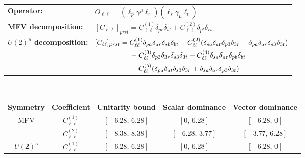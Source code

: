 \begin{table}[htbp]
\centering
{\small
\begin{tabular}{ll}
    \textbf{Operator:} & $\boxed{O_{\ell\ell} = (\overline\ell_p \gamma^\mu \ell_r)(\overline\ell_s \gamma_\mu \ell_t)}$ \\[0.2cm]
    \textbf{MFV decomposition:} &
        $[C_{\ell\ell}]_{prst} = C_{\ell\ell}^{(1)}\delta_{pr}\delta_{st} + C_{\ell\ell}^{(2)}\delta_{pt}\delta_{rs}$ \\[0.15cm]
    \textbf{$U(2)^5$ decomposition:} &
        $[C_{\ell\ell}]_{prst} =
            C_{\ell\ell}^{(1)}\Pij{p}{r}{a}\Pij{s}{t}{b}
            + C_{\ell\ell}^{(2)}(\Pij{s}{t}{a}\delta_{p3}\delta_{3r} + \Pij{p}{r}{a}\delta_{s3}\delta_{3t})$ \\
        & $\phantom{[C_{\ell\ell}]_{prst} ={}}
            + C_{\ell\ell}^{(3)}\delta_{p3}\delta_{3r}\delta_{s3}\delta_{3t}
            + C_{\ell\ell}^{(4)}\Pij{s}{r}{a}\Pij{p}{t}{b}
            $ \\
        & $\phantom{[C_{\ell\ell}]_{prst} ={}}+ C_{\ell\ell}^{(5)}(\Pij{p}{t}{a}\delta_{s3}\delta_{3r} + \Pij{s}{r}{a}\delta_{p3}\delta_{3t})$ \\
\end{tabular}
\\[0.3cm]
\renewcommand{\arraystretch}{1.3}
\begin{tabular}{ccccc}
    \toprule
    \rowcolor{hdrcolor}
    \textbf{Symmetry} & \textbf{Coefficient}
        & \textbf{Unitarity bound}
        & \textbf{Scalar dominance}
        & \textbf{Vector dominance} \\
    \midrule
    \multirow{2}{*}{MFV}
        & $C_{\ell\ell}^{(1)}$ & $[-6.28,\, 6.28]$ & $[0,\, 6.28]$      & $[-6.28,\, 0]$    \\
        & $C_{\ell\ell}^{(2)}$ & $[-8.38,\, 8.38]$ & $[-6.28,\, 3.77]$  & $[-3.77,\, 6.28]$ \\
    \midrule
    \multirow{5}{*}{$U(2)^5$}
        & $C_{\ell\ell}^{(1)}$ & $[-6.28,\, 6.28]$ & $[0,\, 6.28]$     & $[-6.28,\, 0]$    \\

\end{tabular}}
\end{table}
